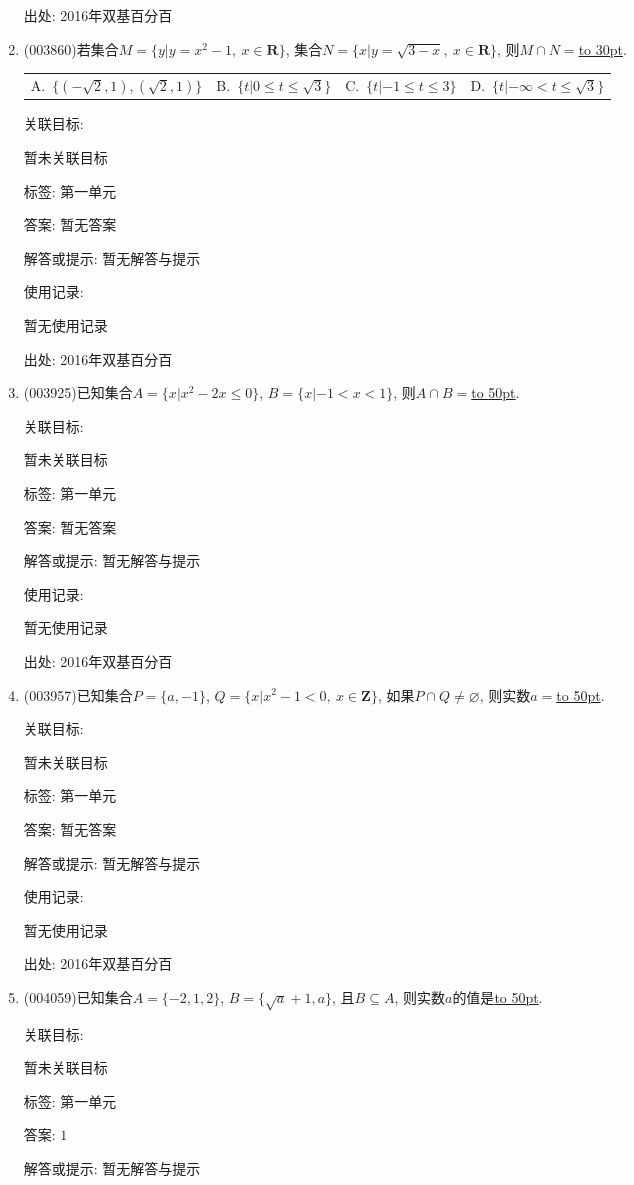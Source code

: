 \documentclass[10pt,a4paper]{article}
\newcommand{\blank}[1]{\underline{\hbox to #1pt{}}}
\newcommand{\fourch}[4]{\par\begin{tabular}{p{.23\textwidth}p{.23\textwidth}p{.23\textwidth}p{.23\textwidth}}
A.~#1 &B.~#2& C.~#3& D.~#4
\end{tabular}}
\begin{document}
\begin{enumerate}[1.]
出处: 2016年双基百分百
\item { (003860)}若集合$M=\{y|y=x^2-1, \ x\in \mathbf{R}\}$, 集合$N=\{x|y=\sqrt{3-x}, \ x\in \mathbf{R}\}$, 则$M\cap N=$\blank{30}.
\fourch{$\{(-\sqrt{2},1),(\sqrt{2},1)\}$}{$\{t|0\le t\le \sqrt{3}\}$}{$\{t|-1\le t\le 3\}$}{$\{t|-\infty<t\le \sqrt{3}\}$}


关联目标:

暂未关联目标



标签: 第一单元

答案: 暂无答案

解答或提示: 暂无解答与提示

使用记录:

暂无使用记录


出处: 2016年双基百分百
\item { (003925)}已知集合$A=\{x|x^2-2x\le 0 \}$, $B=\{x|-1<x<1\}$, 则$A\cap B=$\blank{50}.


关联目标:

暂未关联目标



标签: 第一单元

答案: 暂无答案

解答或提示: 暂无解答与提示

使用记录:

暂无使用记录


出处: 2016年双基百分百
\item { (003957)}已知集合$P=\{a,-1\}$, $Q=\{x|x^2-1<0, \ x\in \mathbf{Z}\}$, 如果$P\cap Q\ne\varnothing$, 则实数$a=$\blank{50}.


关联目标:

暂未关联目标



标签: 第一单元

答案: 暂无答案

解答或提示: 暂无解答与提示

使用记录:

暂无使用记录


出处: 2016年双基百分百
\item { (004059)}已知集合$A=\{-2,1,2\}$, $B=\{\sqrt a+1,a\}$, 且$B\subseteq A$, 则实数$a$的值是\blank{50}.


关联目标:

暂未关联目标



标签: 第一单元

答案: $1$

解答或提示: 暂无解答与提示


\end{enumerate}
\end{document}

